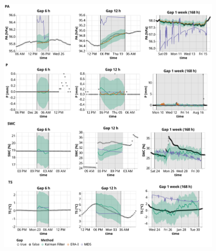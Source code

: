 \documentclass{article}
\newcommand{\imgwidth}{6in}
\let\Oldsubsection\subsection
\renewcommand{\subsection}{\FloatBarrier\Oldsubsection}
\begin{document}
\begin{figure}
\centerline{\includegraphics[width=\imgwidth]{timeseries_2_2}}
\caption{}
\label{fig:ts_3-2}
\end{figure}
\restoregeometry


\newcommand{\CapGapLen}{Imputation performance of the Kalman filter in comparison to the state-of-the-art
methods: ERA-Interim (ERA-I) and Marginal Distribution Sampling (MDS), using mean and standard deviation of the \textit{Root Mean Square Error} (RMSE). The best method for each gap length is highlighted in bold. For each combination of gap length and variable, 500 artificial gaps were created.}


\newcommand{\CapGapSingle}{Imputation performance of the Kalman filter in comparison to the state-of-the-art
methods: ERA-Interim (ERA-I) and Marginal Distribution Sampling (MDS), using mean and standard deviation of the \textit{Root Mean Square Error} (RMSE). The best method for each gap length is highlighted in bold. For each combination of gap length and variable, 500 artificial gaps were created.}

\end{document}
